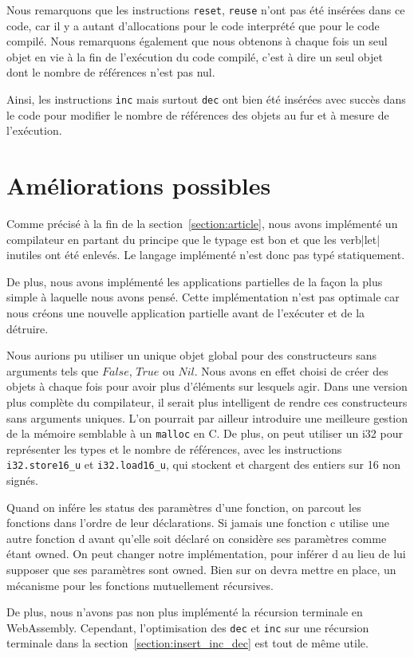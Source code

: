 \documentclass{rapportECL}
\begin{document}
Nous remarquons que les instructions \verb|reset|, \verb|reuse| n'ont pas été insérées dans ce code, car il y a autant 
d'allocations pour le code interprété que pour le code compilé. Nous remarquons également que nous obtenons à chaque fois 
un seul objet en vie à la fin de l'exécution du code compilé, c'est à dire un seul objet dont le nombre de références n'est pas 
nul. 

Ainsi, les instructions \verb|inc| mais surtout \verb|dec| ont bien été insérées avec succès dans le code pour modifier le nombre de références 
des objets au fur et à mesure de l'exécution.

\section{Améliorations possibles}

Comme précisé à la fin de la section~\ref{section:article}, nous avons implémenté un compilateur en partant du principe que le 
typage est bon et que les verb|let| inutiles ont été enlevés. Le langage implémenté n'est donc pas typé statiquement.

De plus, nous avons implémenté les applications partielles de la façon la plus simple à laquelle nous avons pensé. 
Cette implémentation n'est pas optimale car nous créons une nouvelle application partielle avant de l'exécuter et de la détruire.

Nous aurions pu utiliser un unique objet global pour des constructeurs sans arguments tels que $False$, $True$ ou $Nil$. 
Nous avons en effet choisi de créer des objets à chaque fois pour avoir plus d'éléments sur lesquels agir. Dans une 
version plus complète du compilateur, il serait plus intelligent de rendre ces constructeurs sans arguments uniques. L'on 
pourrait par ailleur introduire une meilleure gestion de la mémoire semblable à un \verb|malloc| en C. De plus, on peut 
utiliser un i32 pour représenter les types et le nombre de références, avec les instructions \verb|i32.store16_u| et \verb|i32.load16_u|,
qui stockent et chargent des entiers sur 16 non signés.

Quand on infére les status des paramètres d'une fonction, on parcout les fonctions dans l'ordre de leur déclarations. 
Si jamais une fonction c utilise une autre fonction d avant qu'elle soit déclaré on considère ses paramètres comme étant owned.
On peut changer notre implémentation, pour inférer d au lieu de lui supposer que ses paramètres sont owned.
Bien sur on devra mettre en place, un mécanisme pour les fonctions mutuellement récursives.

De plus, nous n'avons pas non plus implémenté la récursion terminale en WebAssembly. Cependant, l'optimisation des \verb|dec| et \verb|inc| 
sur une récursion terminale dans la section~\ref{section:insert_inc_dec} est tout de même utile.

\newpage

\printbibliography
\end{document}
